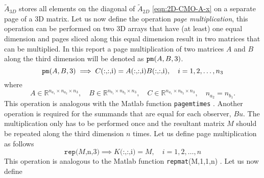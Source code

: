 $\tilde{A}_{3D}$ stores all elements on the diagonal of $\tilde{A}_{2D}$ \eqref{eqn:2D-CMO-A-x} on a separate page of a 3D matrix. Let us now define the operation \textit{page multiplication}, this operation can be performed on two 3D arrays that have (at least) one equal dimension and pages sliced along this equal dimension result in two matrices that can be multiplied. In this report a page multiplication of two  matrices $A$ and $B$ along the third dimension will be denoted as $\texttt{pm}(A,B,3)$.
\begin{equation}\label{eqn:page-multiplication}
    \texttt{pm}(A,B,3) \implies C\text{(:,:,i)} =  A\text{(:,:,i)}B\text{(:,:,i)}, \quad i=1,2,\dots,n_3
\end{equation}
where
\begin{equation*}
    A \in \mathbb{R}^{n_{a_1} \times n_{a_2} \times n_3}, \quad B \in \mathbb{R}^{n_{b_1} \times n_{b_2} \times n_3}, \quad C \in \mathbb{R}^{n_{a_1} \times n_{b_2} \times n_3}, \quad n_{a_2} = n_{b_1}.
\end{equation*}
This operation is analogous with the Matlab function \texttt{pagemtimes} \cite{2022MATLABR2022b}. Another operation is required for the summands that are equal for each observer, $Bu$. The multiplication only has to be performed once and the resultant matrix $M$ should be repeated along the third dimension $n$ times. Let us define page multiplication as follows
\begin{equation}\label{eqn:page-repetition}
    \texttt{rep}\text{(}M\text{,n,3)} \implies K\text{(:,:,i)} = M, \quad i=1,2,\dots,n
\end{equation}
This operation is analogous to the Matlab function \texttt{repmat}(M,1,1,n) \cite{2022MATLABR2022b}. Let us now define

